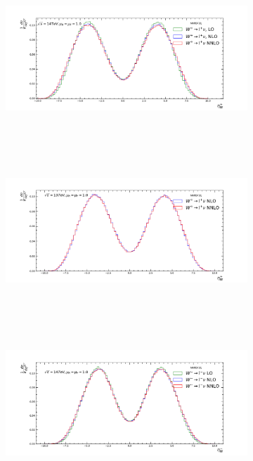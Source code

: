 \begin{figure}[H]
\centering
\begin{subfigure}{0.49\textwidth}
\includegraphics[height=6cm ,width=\textwidth]{chapter4/Wpeta_rf1_14.pdf}
\vspace*{-8mm}
\caption{}
\label{eta141}
\end{subfigure}
\begin{subfigure}{0.49\textwidth}
\includegraphics[height=6cm, width=\textwidth]{chapter4/Wpeta_rf1_13.pdf}
\vspace*{-8mm}
\caption{}
\label{eta131}
\end{subfigure}
\begin{subfigure}{0.49\textwidth}
\includegraphics[height=6cm, width=\textwidth]{chapter4/Wmeta_rf1_14.pdf}
\vspace*{-8mm}

\end{subfigure}
\end{figure}
